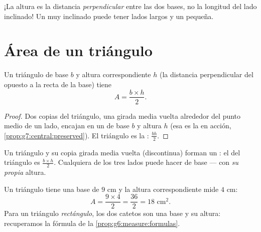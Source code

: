 \begin{remark}
¡La altura es la distancia \emph{perpendicular} entre las dos bases,
no la longitud del lado inclinado! Un  muy inclinado puede
tener lados largos y un  pequeña.
\end{remark}

\section{Área de un triángulo}

\begin{theorem}[Triángulo]\label{thm:g7:areas:triangle}
Un triángulo de base $b$ y altura correspondiente $h$ (la
distancia perpendicular del  opuesto a la recta de la base) tiene
\[
A = \frac{b \times h}{2} .
\]
\end{theorem}

\begin{proof}
Dos copias del triángulo, una girada media vuelta alrededor del
punto medio de un lado, encajan en un  de base $b$
y altura $h$ (esa es la  en acción,
\cref{prop:g7:central:preserved}). El triángulo es la :
$\frac{bh}{2}$.
\end{proof}

\begin{omfigure}

{\small Un triángulo y su copia girada media vuelta (discontinua) forman un
: el  del triángulo es $\frac{b\times h}{2}$. Cualquiera de los
tres lados puede hacer de base --- con \emph{su propia} altura.}
\end{omfigure}

\begin{example}\label{ex:g7:areas:triangle}
Un triángulo tiene una base de $9$ cm y la altura correspondiente mide
$4$ cm:
\[
A = \frac{9 \times 4}{2} = \frac{36}{2} = 18 \text{ cm}^2 .
\]
Para un triángulo \emph{rectángulo}, los dos catetos son una base y su altura:
recuperamos la fórmula de la \cref{prop:g6:measure:formulas}.
\end{example}

